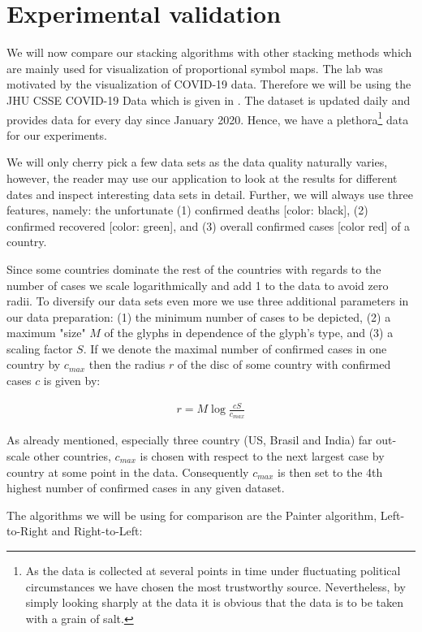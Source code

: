 \documentclass[a4paper,11pt]{article}
\begin{document}
\section{Experimental validation}

We will now compare our stacking algorithms with other stacking methods which are mainly used for visualization of proportional symbol maps. The lab was motivated by the visualization of COVID-19 data. Therefore we will be using the JHU CSSE COVID-19 Data which is given in \cite{data}. The dataset is updated daily and provides data for every day since January 2020. Hence, we have a plethora\footnote{As the data is collected at several points in time under fluctuating political circumstances we have chosen the most trustworthy source. Nevertheless, by simply looking sharply at the data it is obvious that the data is to be taken with a grain of salt.} data for our experiments.

We will only cherry pick a few data sets as the data quality naturally varies, however, the reader may use our application to look at the results for different dates and inspect interesting data sets in detail. Further, we will always use three features, namely:  the unfortunate (1) confirmed deaths [color: black], (2) confirmed recovered [color: green], and (3) overall confirmed cases [color red] of a country.

Since some countries dominate the rest of the countries with regards to the number of cases we scale logarithmically and add 1 to the data to avoid zero radii. To diversify our data sets even more we use three additional parameters in our data preparation: (1) the minimum number of cases to be depicted, (2) a maximum "size" $M$ of the glyphs in dependence of the glyph's type, and (3) a scaling factor $S$. If we denote the maximal number of confirmed cases in one country by $c_{max}$ then the radius $r$ of the disc of some country with confirmed cases $c$ is given by:

\begin{align*}
  r=M\log\frac{c S}{c_{max}}
\end{align*}

As already mentioned, especially three country (US, Brasil and India) far out-scale other countries, $c_{max}$ is chosen with respect to the next largest case by country at some point in the data. Consequently $c_{max}$ is then set to the 4th highest number of confirmed cases in any given dataset.

The algorithms we will be using for comparison are the Painter algorithm, Left-to-Right and Right-to-Left:
\end{document}

